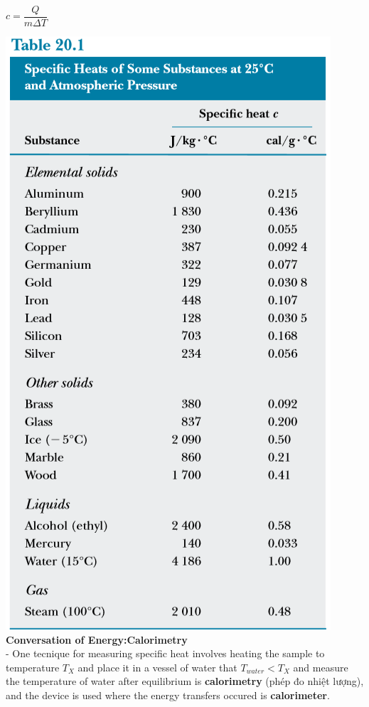 \documentclass[10pt]{article}
\begin{document}
\begin{enumerate}
	\begin{mybox}
	\begin{center}
	$c = \dfrac{Q}{m \Delta T}$
	\end{center}
	\end{mybox}
      \includegraphics{Hinh2}\\  
	\textbf{Conversation of Energy:Calorimetry}\\
	- One tecnique for measuring specific heat involves heating the sample to temperature $T_X$ and place it in a vessel of water that $T_{water} < T_X$ and measure the temperature of water after equilibrium is \textbf{calorimetry} (phép đo nhiệt lượng), and the device is used where the energy transfers occured is \textbf{calorimeter}.\\

\end{enumerate}
\end{document}
